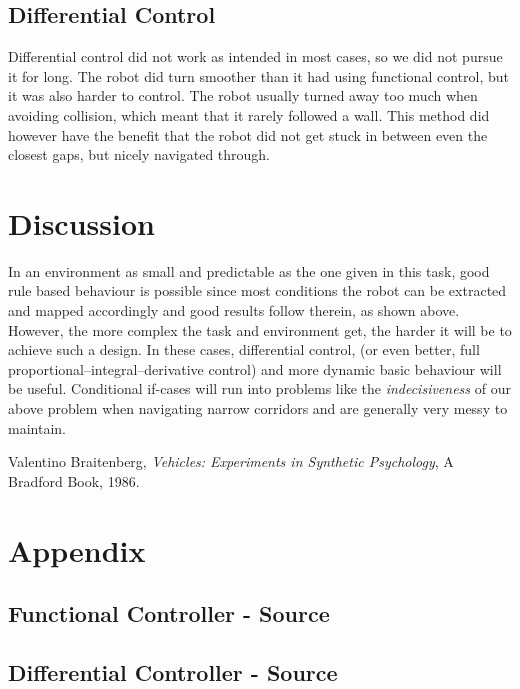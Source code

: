 \documentclass[paper=a4, fontsize=12pt]{scrartcl}	%
\numberwithin{equation}{section}		%
\numberwithin{figure}{section}			%
\numberwithin{table}{section}				%
\begin{document}
\subsection{Differential Control}
Differential control did not work as intended in most cases, so we did not pursue it for long. The robot did turn smoother than it had using functional control, but it was also harder to control. The robot usually turned away too much when avoiding collision, which meant that it rarely followed a wall. This method did however have the benefit that the robot did not get stuck in between even the closest gaps, but nicely navigated through.
\section{Discussion}
In an environment as small and predictable as the one given in this task, good rule based behaviour is possible since most conditions the robot can be extracted and mapped accordingly and good results follow therein, as shown above. However, the more complex the task and environment get, the harder it will be to achieve such a design. In these cases, differential control, (or even better, full proportional–integral–derivative control) and more dynamic basic behaviour will be useful. Conditional if-cases will run into problems like the \emph{indecisiveness} of our above problem when navigating narrow corridors and are generally very messy to maintain.
\begin{thebibliography}{9}
  Valentino Braitenberg,
  \emph{Vehicles: Experiments in Synthetic Psychology},
  A Bradford Book,
  1986.
\end{thebibliography}
\section{Appendix}
\subsection{Functional Controller - Source}

\subsection{Differential Controller - Source}



\end{document}
